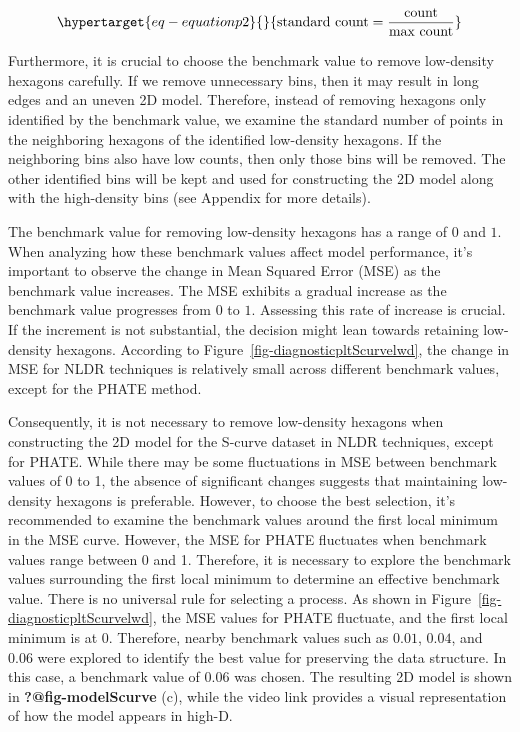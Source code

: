 \documentclass[
  12pt]{article}
\begin{document}
\begin{equation}\protect\hypertarget{eq-equationp2}{}{
\text{standard count} = \frac{\text{count}}{\text{max count}} 
}\label{eq-equationp2}\end{equation}

Furthermore, it is crucial to choose the benchmark value to remove
low-density hexagons carefully. If we remove unnecessary bins, then it
may result in long edges and an uneven 2D model. Therefore, instead of
removing hexagons only identified by the benchmark value, we examine the
standard number of points in the neighboring hexagons of the identified
low-density hexagons. If the neighboring bins also have low counts, then
only those bins will be removed. The other identified bins will be kept
and used for constructing the 2D model along with the high-density bins
(see Appendix for more details).

The benchmark value for removing low-density hexagons has a range of
\(0\) and \(1\). When analyzing how these benchmark values affect model
performance, it's important to observe the change in Mean Squared Error
(MSE) as the benchmark value increases. The MSE exhibits a gradual
increase as the benchmark value progresses from \(0\) to \(1\).
Assessing this rate of increase is crucial. If the increment is not
substantial, the decision might lean towards retaining low-density
hexagons. According to Figure~\ref{fig-diagnosticpltScurvelwd}, the
change in MSE for NLDR techniques is relatively small across different
benchmark values, except for the PHATE method.

Consequently, it is not necessary to remove low-density hexagons when
constructing the 2D model for the S-curve dataset in NLDR techniques,
except for PHATE. While there may be some fluctuations in MSE between
benchmark values of 0 to 1, the absence of significant changes suggests
that maintaining low-density hexagons is preferable. However, to choose
the best selection, it's recommended to examine the benchmark values
around the first local minimum in the MSE curve. However, the MSE for
PHATE fluctuates when benchmark values range between 0 and 1. Therefore,
it is necessary to explore the benchmark values surrounding the first
local minimum to determine an effective benchmark value. There is no
universal rule for selecting a process. As shown in
Figure~\ref{fig-diagnosticpltScurvelwd}, the MSE values for PHATE
fluctuate, and the first local minimum is at \(0\). Therefore, nearby
benchmark values such as \(0.01\), \(0.04\), and \(0.06\) were explored
to identify the best value for preserving the data structure. In this
case, a benchmark value of \(0.06\) was chosen. The resulting 2D model
is shown in \textbf{?@fig-modelScurve} (c), while the video link
provides a visual representation of how the model appears in high-D.
\end{document}
